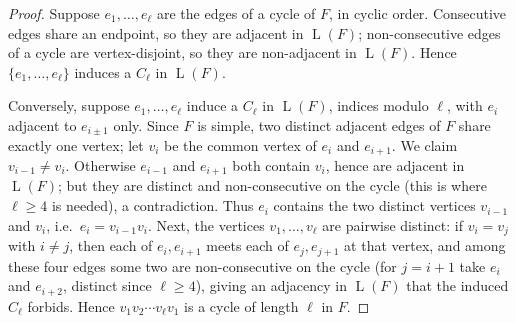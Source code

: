 \documentclass[11pt,a4paper]{article}
\theoremstyle{plain}
\theoremstyle{definition}
\theoremstyle{remark}
\newcommand{\Ln}{\operatorname{L}}
\begin{document}
\label{pf:line}
\lemline*
\begin{proof}
Suppose $e_1,\dots,e_\ell$ are the edges of a cycle of $F$, in cyclic order. Consecutive edges share an endpoint, so they are adjacent in $\Ln(F)$; non-consecutive edges of a cycle are vertex-disjoint, so they are non-adjacent in $\Ln(F)$. Hence $\{e_1,\dots,e_\ell\}$ induces a $C_\ell$ in $\Ln(F)$.

Conversely, suppose $e_1,\dots,e_\ell$ induce a $C_\ell$ in $\Ln(F)$, indices modulo $\ell$, with $e_i$ adjacent to $e_{i\pm1}$ only. Since $F$ is simple, two distinct adjacent edges of $F$ share exactly one vertex; let $v_i$ be the common vertex of $e_i$ and $e_{i+1}$. We claim $v_{i-1}\ne v_i$. Otherwise $e_{i-1}$ and $e_{i+1}$ both contain $v_i$, hence are adjacent in $\Ln(F)$; but they are distinct and non-consecutive on the cycle (this is where $\ell\ge4$ is needed), a contradiction. Thus $e_i$ contains the two distinct vertices $v_{i-1}$ and $v_i$, i.e.\ $e_i=v_{i-1}v_i$. Next, the vertices $v_1,\dots,v_\ell$ are pairwise distinct: if $v_i=v_j$ with $i\ne j$, then each of $e_i,e_{i+1}$ meets each of $e_j,e_{j+1}$ at that vertex, and among these four edges some two are non-consecutive on the cycle (for $j=i+1$ take $e_i$ and $e_{i+2}$, distinct since $\ell\ge4$), giving an adjacency in $\Ln(F)$ that the induced $C_\ell$ forbids. Hence $v_1v_2\cdots v_\ell v_1$ is a cycle of length $\ell$ in $F$.
\end{proof}
\end{document}
